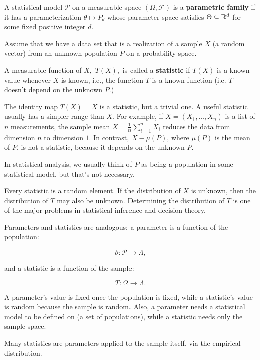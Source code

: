 \documentclass{article}
\begin{document}
\begin{definition}
        A \@{statistical model} $\mathcal{P}$ on a \@{measurable space} $(\Omega, \mathcal{F})$ is a
        \textbf{parametric family} if it has a \@{parameterization} $\theta \mapsto P_\theta$ whose
        \@{parameter space} satisfies $\Theta \subseteq \mathbb{R}^d$ for some fixed positive
        \@{integer} $d$.
\end{definition}

\begin{definition}[Statistic]
	Assume that we have a \@{data set} that is a realization of a \@{sample} $X$ (a \@{random vector}) from an unknown \@{population} $P$ on a \@{probability space}.

	A \@{measurable function} of $X,$ $T(X),$ is called a \textbf{statistic} if $T(X)$ is a known value whenever $X$ is known, i.e., the function $T$ is a known function (i.e. $T$ doesn't depend on the unknown $P$.)
\end{definition}
\begin{remark}
	The \@{identity map} $T(X) = X$ is a \@{statistic}, but a trivial one. A useful statistic usually
	has a simpler \@{range} than $X$. For example, if $X = (X_1, \dots, X_n)$ is a list of $n$
	measurements, the \@{sample} \@{mean} $\bar{X} = \frac{1}{n}\sum_{i=1}^n X_i$ reduces the data
	from \@{dimension} $n$ to dimension $1$. In contrast, $\bar{X} - \mu(P)$, where $\mu(P)$ is the
        mean of $P$, is not a statistic, because it depends on the unknown $P$.

	In statistical analysis, we usually think of $P$ as being a \@{population} in some \@{statistical model},
	but that's not necessary.

	Every statistic is a \@{random element}. If the \@{distribution} of $X$ is unknown, then the
	distribution of $T$ may also be unknown. Determining the distribution of $T$ is one of the
	major problems in statistical inference and decision theory.
\end{remark}

\begin{remark}
        \@{Parameters} and \@{statistics} are analogous: a parameter is a function of the
        \@{population}:

	\[ \vartheta : \mathcal{P} \to \Lambda, \]

	and a statistic is a function of the \@{sample}:
	
	\[ T : \Omega \to \Lambda. \]

	A parameter's value is fixed once the population is fixed, while a statistic's value is random because the
	sample is random. Also, a parameter needs a \@{statistical model} to be defined on (a set of populations),
	while a statistic needs only the \@{sample space}.

	Many statistics are parameters applied to the sample itself, via the \@{empirical distribution}.
\end{remark}
\end{document}
